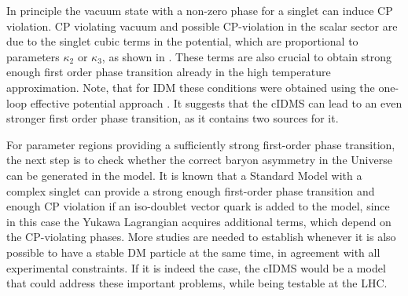\documentclass{PoS}
\begin{document}
{In principle the vacuum state with {a} non-zero phase for a singlet {can induce CP violation}.  
CP violating vacuum and possible  CP-violation in the scalar sector are due to  the {singlet} cubic terms  in the potential, {which are} proportional to parameters $\kappa_2$ or $\kappa_3$, as shown in \cite{Darvishi:2016gvm}. 
These terms are also crucial to obtain strong enough first order phase transition already in the high temperature approximation.  Note, that for IDM these conditions were obtained using the one-loop effective potential approach \cite{Hambye:2007vf,Chowdhury:2011ga,Gil:2012ya}. {It suggests that the cIDMS can lead to {an} even stronger first order phase transition, {as it contains} two sources {for it}. }

{For parameter {regions} {providing {a} sufficiently strong} first-order phase transition}, the next step is to check {whether the} correct baryon asymmetry in the Universe can be generated {in the model}. It is known that a Standard Model with a complex singlet can provide   a strong enough first-order phase transition \cite{Darvishi:2016tni}  and  enough CP violation if an iso-doublet vector quark is added to the model,
since {in this case} the Yukawa Lagrangian acquires additional terms, which depend on the CP-violating phases. More studies are needed to establish whenever it is also possible to have a stable DM particle at the same time, in agreement with all experimental constraints. If it is indeed the case, the cIDMS would be a model that could address these important problems, while being testable at the LHC.

}
\end{document}
